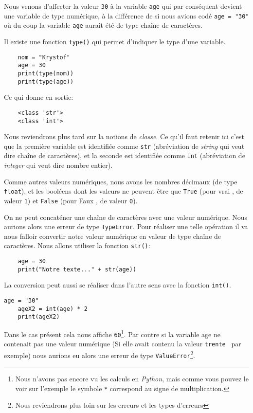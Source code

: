 Nous venons d'affecter la valeur \texttt{30} à la variable \texttt{age} qui par conséquent devient une variable de type numérique, à la différence de si nous avions codé \verb|age = "30"| où du coup la variable \texttt{age} aurait été de type chaîne de caractères.
\medskip

Il existe une fonction \texttt{type()} qui permet d'indiquer le type d'une variable.
\begin{lstlisting}
    nom = "Krystof"
    age = 30
    print(type(nom))
    print(type(age))
\end{lstlisting}
\medskip

Ce qui donne en sortie:
\begin{verbatim}
    <class 'str'>
    <class 'int'>
\end{verbatim}
\medskip

Nous reviendrons plus tard sur la notions de \textit{classe}. Ce qu'il faut retenir ici c'est que la première variable est identifiée comme \texttt{str} (abréviation de \textit{string} qui veut dire \og chaîne de caractères\fg), et la seconde est identifiée comme \texttt{int} (abréviation de \textit{integer} qui veut dire \og nombre entier\fg).
\medskip

Comme autres valeurs numériques, nous avons les nombres décimaux (de type \texttt{float}), et les booléens dont les valeurs ne peuvent être que \texttt{True} (pour \og vrai \fg, de valeur \texttt{1}) et \texttt{False} (pour \og Faux \fg, de valeur \texttt{0}).
\medskip
  
On ne peut concaténer une chaîne de caractères avec une valeur numérique. Nous aurions alors une erreur de type \texttt{TypeError}. Pour réaliser une telle opération il va nous falloir convertir notre valeur numérique en valeur de type chaîne de caractères. Nous allons utiliser la fonction \texttt{str()}:
\begin{lstlisting}
    age = 30
    print("Notre texte..." + str(age))
\end{lstlisting}
\medskip

La conversion peut aussi se réaliser dans l'autre sens avec la fonction \texttt{int()}.
\begin{lstlisting}[caption=Conversion avec la fonction \texttt{int}]
	age = "30"
	ageX2 = int(age) * 2
	print(ageX2)
\end{lstlisting}
\medskip

Dans le cas présent cela nous affiche \texttt{60}\footnote{Nous n'avons pas encore vu les calculs en \textit{Python}, mais comme vous pouvez le voir sur l'exemple le symbole \texttt{*} correspond au signe de multiplication.}. Par contre si la variable age ne contenait pas une valeur numérique (Si elle avait contenu la valeur \texttt{\og trente \fg} par exemple) nous aurions eu alors une erreur de type \texttt{ValueError}\footnote{Nous reviendrons plus loin sur les erreurs et les types d'erreurs}.
\medskip

